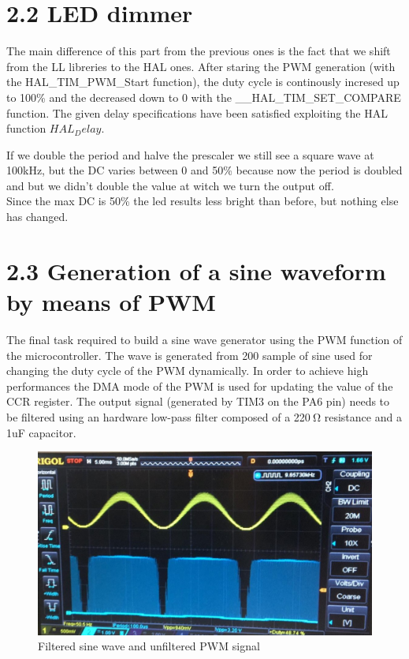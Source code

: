 \documentclass[12pt]{article}
\begin{document}
\section*{2.2 LED dimmer}
The main difference of this part from the previous ones is the fact that we shift from the LL libreries to the HAL ones. After staring the PWM generation (with the HAL\_TIM\_PWM\_Start function), the duty cycle is continously incresed up to 100\% and the decreased down to 0 with the \_\_HAL\_TIM\_SET\_COMPARE function.
The given delay specifications have been satisfied exploiting the HAL function $HAL_Delay$.

If we double the period and halve the prescaler we still see a square wave at 100kHz, but the DC varies between 0 and 50\% because now the period is doubled and but we didn't double the value at witch we turn the output off.\\
Since the max DC is 50\% the led results less bright than before, but nothing else has changed.
 
 \section*{2.3 Generation of a sine waveform by means of PWM }
 
 The final task required to build a sine wave generator using the PWM function of the microcontroller. The wave is generated from 200 sample of sine used for changing the duty cycle of the PWM dynamically. In order to achieve high performances the DMA mode of the PWM is used for updating the value of the CCR register. The output signal (generated by TIM3 on the PA6 pin) needs to be filtered using an hardware low-pass filter composed of a 220$\SI{}{\ohm}$ resistance and a 1uF capacitor. 
 
\begin{figure}[h!]
	\centering
	\includegraphics[scale = 0.45]{immagini/1sig.jpeg}
	\caption{Filtered sine wave and unfiltered PWM signal}
\end{figure}
\end{document}

